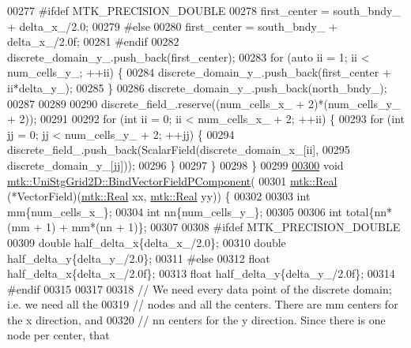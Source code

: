 \begin{DoxyCode}
00277 \textcolor{preprocessor}{  #ifdef MTK\_PRECISION\_DOUBLE}
00278   first\_center = south\_bndy\_ + delta\_x\_/2.0;
00279 \textcolor{preprocessor}{  #else}
00280   first\_center = south\_bndy\_ + delta\_x\_/2.0f;
00281 \textcolor{preprocessor}{  #endif}
00282   discrete\_domain\_y\_.push\_back(first\_center);
00283   \textcolor{keywordflow}{for} (\textcolor{keyword}{auto} ii = 1; ii < num\_cells\_y\_; ++ii) \{
00284     discrete\_domain\_y\_.push\_back(first\_center + ii*delta\_y\_);
00285   \}
00286   discrete\_domain\_y\_.push\_back(north\_bndy\_);
00287 
00289 
00290   discrete\_field\_.reserve((num\_cells\_x\_ + 2)*(num\_cells\_y\_ + 2));
00291 
00292   \textcolor{keywordflow}{for} (\textcolor{keywordtype}{int} ii = 0; ii < num\_cells\_x\_ + 2; ++ii) \{
00293     \textcolor{keywordflow}{for} (\textcolor{keywordtype}{int} jj = 0; jj < num\_cells\_y\_ + 2; ++jj) \{
00294       discrete\_field\_.push\_back(ScalarField(discrete\_domain\_x\_[ii],
00295                                             discrete\_domain\_y\_[jj]));
00296     \}
00297   \}
00298 \}
00299 
\hypertarget{mtk__uni__stg__grid__2d_8cc_source_l00300}{}\hyperlink{classmtk_1_1UniStgGrid2D_a5ff685fde27134437dd0b372fb6b9958}{00300} \textcolor{keywordtype}{void} \hyperlink{classmtk_1_1UniStgGrid2D_a5ff685fde27134437dd0b372fb6b9958}{mtk::UniStgGrid2D::BindVectorFieldPComponent}(
00301   \hyperlink{group__c01-roots_gac080bbbf5cbb5502c9f00405f894857d}{mtk::Real} (*VectorField)(\hyperlink{group__c01-roots_gac080bbbf5cbb5502c9f00405f894857d}{mtk::Real} xx, \hyperlink{group__c01-roots_gac080bbbf5cbb5502c9f00405f894857d}{mtk::Real} yy)) \{
00302 
00303   \textcolor{keywordtype}{int} mm\{num\_cells\_x\_\};
00304   \textcolor{keywordtype}{int} nn\{num\_cells\_y\_\};
00305 
00306   \textcolor{keywordtype}{int} total\{nn*(mm + 1) + mm*(nn + 1)\};
00307 
00308 \textcolor{preprocessor}{  #ifdef MTK\_PRECISION\_DOUBLE}
00309   \textcolor{keywordtype}{double} half\_delta\_x\{delta\_x\_/2.0\};
00310   \textcolor{keywordtype}{double} half\_delta\_y\{delta\_y\_/2.0\};
00311 \textcolor{preprocessor}{  #else}
00312   \textcolor{keywordtype}{float} half\_delta\_x\{delta\_x\_/2.0f\};
00313   \textcolor{keywordtype}{float} half\_delta\_y\{delta\_y\_/2.0f\};
00314 \textcolor{preprocessor}{  #endif}
00315 
00317 
00318   \textcolor{comment}{// We need every data point of the discrete domain; i.e. we need all the}
00319   \textcolor{comment}{// nodes and all the centers. There are mm centers for the x direction, and}
00320   \textcolor{comment}{// nn centers for the y direction. Since there is one node per center, that}

\end{DoxyCode}
